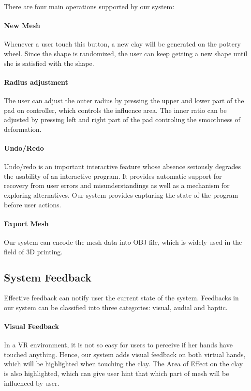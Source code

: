 
There are four main operations supported by our system:

\paragraph{New Mesh}
Whenever a user touch this button, a new clay will be generated on the pottery wheel. Since the shape is randomized, the user can keep getting a new shape until she is satisfied with the shape.

\paragraph{Radius adjustment}
The user can adjust the outer radius by pressing the upper and lower part of the pad on controller, which controls the influence area. The inner ratio can be adjusted by pressing left and right part of the pad controling the smoothness of deformation.


\paragraph{Undo/Redo}
Undo/redo is an important interactive feature whose absence seriously degrades the usability of an interactive program.\cite{choudhary1995general} It provides automatic support for recovery from user errors and misunderstandings as well as a mechanism for exploring alternatives. Our system provides capturing the state of the program before user actions.

\paragraph{Export Mesh}
Our system can encode the mesh data into OBJ file, which is widely used in the field of 3D printing.

\subsection{System Feedback}
\label{sec:4.4}
Effective feedback can notify user the current state of the system. Feedbacks in our system can be classified into three categories: visual, audial and haptic.

\paragraph{Visual Feedback}
In a VR environment, it is not so easy for users to perceive if her hands have touched anything. Hence, our system adds visual feedback on both virtual hands, which will be highlighted when touching the clay. The Area of Effect on the clay is also highlighted, which can give user hint that which part of mesh will be influenced by user.

